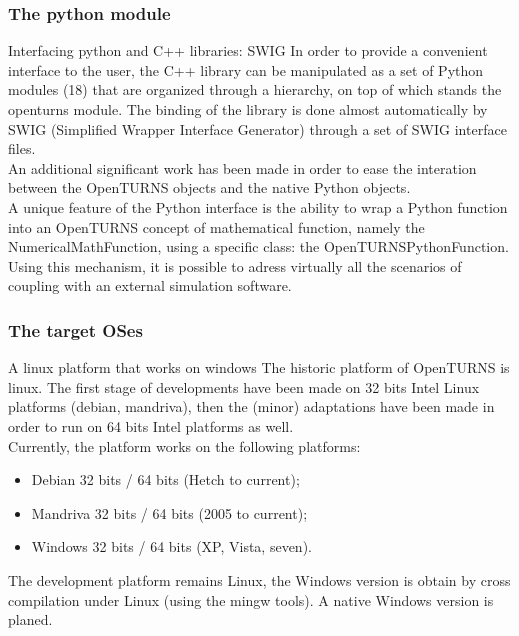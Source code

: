 \documentclass[8pt]{beamer}
\begin{document}
\begin{frame}
  \frametitle{The python module}
  \begin{block}{Interfacing python and C++ libraries: SWIG}
    In order to provide a convenient interface to the user, the C++ library can be manipulated as a set of Python modules (18) that are organized through a hierarchy, on top of which stands the openturns module. The binding of the library is done almost automatically by SWIG (Simplified Wrapper Interface Generator) through a set of SWIG interface files.\\
    An additional significant work has been made in order to ease the interation between the OpenTURNS objects and the native Python objects.\\
    A unique feature of the Python interface is the ability to wrap a Python function into an OpenTURNS concept of mathematical function, namely the NumericalMathFunction, using a specific class: the OpenTURNSPythonFunction. Using this mechanism, it is possible to adress virtually all the scenarios of coupling with an external simulation software.
  \end{block}
\end{frame}
\begin{frame}
  \frametitle{The target OSes}
  \begin{block}{A linux platform that works on windows}
    The historic platform of OpenTURNS is linux. The first stage of developments have been made on 32 bits Intel Linux platforms (debian, mandriva), then the (minor) adaptations have been made in order to run on 64 bits Intel platforms as well.\\
    Currently, the platform works on the following platforms:
    \begin{itemize}
      \item Debian 32 bits / 64 bits (Hetch to current);
      \item Mandriva 32 bits / 64 bits (2005 to current);
      \item Windows 32 bits / 64 bits (XP, Vista, seven).
    \end{itemize}
    The development platform remains Linux, the Windows version is obtain by cross compilation under Linux (using the mingw tools). A native Windows version is planed.
  \end{block}
\end{frame}
\end{document}

